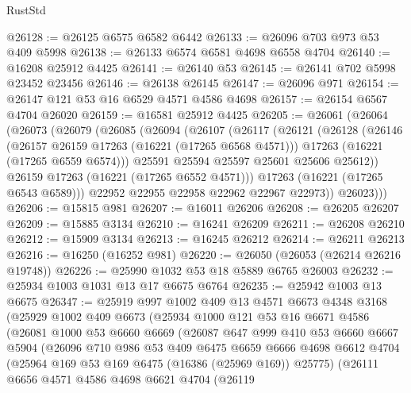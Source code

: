 \begin{lexlean}{RustStd}
\begin{coremodule}
@26128 := @26125 @6575 @6582 @6442
@26133 := @26096 @703 @973 @53 @409 @5998
@26138 := @26133 @6574 @6581 @4698 @6558 @4704
@26140 := @16208 @25912 @4425
@26141 := @26140 @53
@26145 := @26141 @702 @5998 @23452 @23456
@26146 := @26138 @26145
@26147 := @26096 @971
@26154 := @26147 @121 @53 @16 @6529 @4571 @4586 @4698
@26157 := @26154 @6567 @4704 @26020
@26159 := @16581 @25912 @4425
@26205 := @26061
    (@26064
      (@26073
        (@26079
          (@26085
            (@26094
              (@26107
                (@26117
                  (@26121
                    (@26128
                      (@26146
                        (@26157 @26159 @17263 (@16221 (@17265 @6568 @4571)))
                        @17263
                        (@16221 (@17265 @6559 @6574)))
                      @25591
                      @25594
                      @25597
                      @25601
                      @25606
                      @25612))
                  @26159
                  @17263
                  (@16221 (@17265 @6552 @4571)))
                @17263
                (@16221 (@17265 @6543 @6589)))
              @22952
              @22955
              @22958
              @22962
              @22967
              @22973))
          @26023)))
@26206 := @15815 @981
@26207 := @16011 @26206
@26208 := @26205 @26207
@26209 := @15885 @3134
@26210 := @16241 @26209
@26211 := @26208 @26210
@26212 := @15909 @3134
@26213 := @16245 @26212
@26214 := @26211 @26213
@26216 := @16250 (@16252 @981)
@26220 := @26050 (@26053 (@26214 @26216 @19748))
@26226 := @25990 @1032 @53 @18 @5889 @6765 @26003
@26232 := @25934 @1003 @1031 @13 @17 @6675 @6764
@26235 := @25942 @1003 @13 @6675
@26347 := @25919
    @997
    @1002
    @409
    @13
    @4571
    @6673
    @4348
    @3168
    (@25929
      @1002
      @409
      @6673
      (@25934
        @1000
        @121
        @53
        @16
        @6671
        @4586
        (@26081
          @1000
          @53
          @6660
          @6669
          (@26087
            @647
            @999
            @410
            @53
            @6660
            @6667
            @5904
            (@26096
              @710
              @986
              @53
              @409
              @6475
              @6659
              @6666
              @4698
              @6612
              @4704
              (@25964 @169 @53 @169 @6475 (@16386 (@25969 @169)) @25775)
              (@26111
                @6656
                @4571
                @4586
                @4698
                @6621
                @4704
                (@26119

\end{coremodule}
\end{lexlean}
